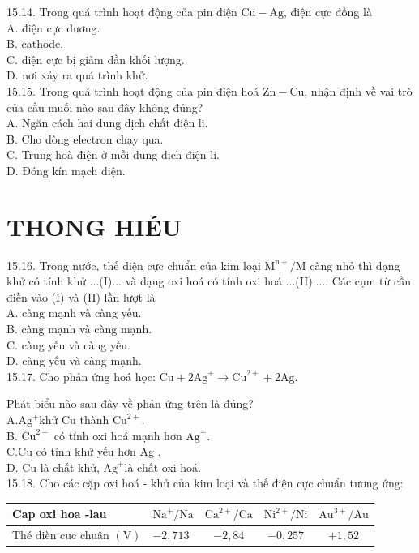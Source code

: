\documentclass[10pt]{article}
\begin{document}
15.14. Trong quá trình hoạt động của pin điện $\mathrm{Cu}-\mathrm{Ag}$, điện cực đồng là\\
A. điện cực dương.\\
B. cathode.\\
C. điện cực bị giảm dần khối lượng.\\
D. nơi xảy ra quá trình khử.\\
15.15. Trong quá trình hoạt động của pin điện hoá $\mathrm{Zn}-\mathrm{Cu}$, nhận định về vai trò của cầu muối nào sau đây không đúng?\\
A. Ngăn cách hai dung dịch chất điện li.\\
B. Cho dòng electron chạy qua.\\
C. Trung hoà điện ở mỗi dung dịch điện li.\\
D. Đóng kín mạch điện.

\section*{THONG HIÉU}
15.16. Trong nước, thế điện cực chuẩn của kim loại $\mathrm{M}^{\mathrm{n}+} / \mathrm{M}$ càng nhỏ thì dạng khử có tính khử ...(I)... và dạng oxi hoá có tính oxi hoá ...(II)..... Các cụm từ cần điền vào (I) và (II) lần lượt là\\
A. càng mạnh và càng yếu.\\
B. càng mạnh và càng mạnh.\\
C. càng yếu và càng yếu.\\
D. càng yếu và càng mạnh.\\
15.17. Cho phản ứng hoá học: $\mathrm{Cu}+2 \mathrm{Ag}^{+} \rightarrow \mathrm{Cu}^{2+}+2 \mathrm{Ag}$.

Phát biểu nào sau đây về phản ứng trên là đúng?\\
$\mathrm{A} . \mathrm{Ag}^{+}$khử Cu thành $\mathrm{Cu}^{2+}$.\\
B. $\mathrm{Cu}^{2+}$ có tính oxi hoá mạnh hơn $\mathrm{Ag}^{+}$.\\
$\mathrm{C} . \mathrm{Cu}$ có tính khử yếu hơn Ag .\\
D. Cu là chất khử, $\mathrm{Ag}^{+}$là chất oxi hoá.\\
15.18. Cho các cặp oxi hoá - khử của kim loại và thế điện cực chuẩn tương ứng:

\begin{center}
\begin{tabular}{|l|l|c|c|c|}
\hline
Cap oxi hoa -lau & $\mathrm{Na}^{+} / \mathrm{Na}$ & $\mathrm{Ca}^{2+} / \mathrm{Ca}$ & $\mathrm{Ni}^{2+} / \mathrm{Ni}$ & $\mathrm{Au}^{3+} / \mathrm{Au}$ \\
\hline
Thé dièn cuc chuân $(\mathrm{V})$ & $-2,713$ & $-2,84$ & $-0,257$ & $+1,52$ \\
\hline
\end{tabular}
\end{center}
\end{document}
